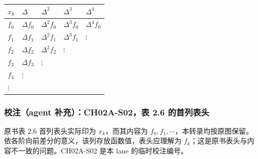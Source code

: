 {\def\LTcaptype{none} %
\begin{longtable}[]{@{}
  >{\raggedright\arraybackslash}p{}
  >{\raggedright\arraybackslash}p{}
  >{\raggedright\arraybackslash}p{}
  >{\raggedright\arraybackslash}p{}
  >{\raggedright\arraybackslash}p{}@{}}
\toprule\noalign{}
\begin{minipage}[b]{\linewidth}\raggedright
\(x_k\)
\end{minipage} & \begin{minipage}[b]{\linewidth}\raggedright
\(\Delta\)
\end{minipage} & \begin{minipage}[b]{\linewidth}\raggedright
\(\Delta^2\)
\end{minipage} & \begin{minipage}[b]{\linewidth}\raggedright
\(\Delta^3\)
\end{minipage} & \begin{minipage}[b]{\linewidth}\raggedright
\(\Delta^4\)
\end{minipage} \\
\midrule\noalign{}
\endhead
\bottomrule\noalign{}
\endlastfoot
\(f_0\) & \(\Delta f_0\) & \(\Delta^2 f_0\) & \(\Delta^3 f_0\) & \(\Delta^4 f_0\) \\
\(f_1\) & \(\Delta f_1\) & \(\Delta^2 f_1\) & \(\Delta^3 f_1\) & \(\vdots\) \\
\(f_2\) & \(\Delta f_2\) & \(\Delta^2 f_2\) & \(\vdots\) & \\
\(f_3\) & \(\Delta f_3\) & \(\vdots\) & & \\
\(f_4\) & \(\vdots\) & & & \\
\(\vdots\) & & & & \\
\end{longtable}
}

\subsubsection{校注（agent 补充）：CH02A-S02，表 2.6 的首列表头}\label{ch02a-ux6821ux6ce8agent-ux8865ux5145ch02a-s02ux8868-2.6-ux7684ux9996ux5217ux8868ux5934}

原书表 2.6 首列表头实际印为 \(x_k\)，而其内容为 \(f_0,f_1,\cdots\)，本转录均按原图保留。依各阶向前差分的意义，该列存放函数值，表头应理解为 \(f_k\)；这是原书表头与内容不一致的问题。CH02A-S02 是本 lane 的临时校注编号。

